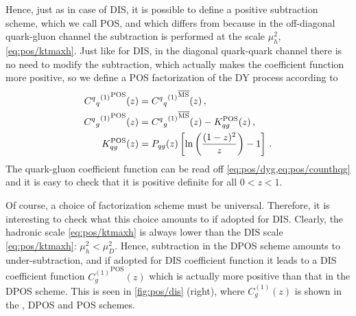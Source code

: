 Hence, just as in case of DIS, it is possible to define a positive
subtraction scheme, which we call POS, and which differs from \msbar{}
because in the off-diagonal quark-gluon channel the
subtraction is performed at the scale $\mu_h^2$,
\cref{eq:pos/ktmaxh}. Just like for DIS, in the diagonal quark-quark
channel there is no need to modify the \msbar{} subtraction, which
actually makes the coefficient function more positive, so we define 
a POS factorization of the DY process according to
\begin{align}\label{eq:pos/counthqq}
 {{C^q{}_q}^{(1)}}^{\textrm{POS}}(z) &=  {{C^q{}_q}^{(1)}}^{{\overline{\textrm{MS}}}}(z) \,, \\
 {{C^q{}_g}^{(1)}}^{\textrm{POS}}(z) &=  {{C^q{}_g}^{(1)}}^{{\overline{\textrm{MS}}}}(z) - K_{qg}^{\textrm{POS}} (z) \,,\\ \label{eq:pos/counthqg}
  K_{qg}^{\textrm{POS}} (z) &=  P_{qg}(z)\left[\ln\left(\frac{(1-z)^2}{z}\right) - 1\right] \,.
\end{align}
The quark-gluon coefficient function can be read off
\cref{eq:pos/dyg,eq:pos/counthqg} and it is easy to check that it
is positive definite for all $0<z<1$.

Of course, a choice of factorization scheme must be
universal. Therefore, it is interesting to check what this choice
amounts to if adopted for DIS. Clearly, the
hadronic scale \cref{eq:pos/ktmaxh} is always lower than the DIS
scale \cref{eq:pos/ktmaxh}: $\mu_h^2< \mu_D^2$. Hence, subtraction in the
DPOS scheme amounts to under-subtraction, and if adopted for DIS
coefficient function it leads to a DIS coefficient function
${C^{(1)}_{g}}^{\textrm{POS}}(z)$ which is actually more positive than that
in the DPOS scheme. This is seen in \cref{fig:pos/dis} (right), where 
${C^{(1)}_{g}}(z)$ is shown in the \msbar{}, DPOS and POS schemes.

